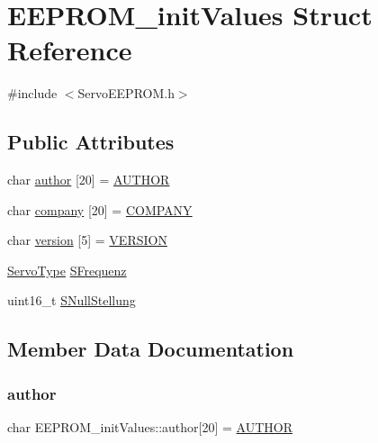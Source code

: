 \hypertarget{struct_e_e_p_r_o_m__init_values}{}\section{E\+E\+P\+R\+O\+M\+\_\+init\+Values Struct Reference}
\label{struct_e_e_p_r_o_m__init_values}


{\ttfamily \#include $<$Servo\+E\+E\+P\+R\+O\+M.\+h$>$}

\subsection*{Public Attributes}
\begin{DoxyCompactItemize}
\item 
char \hyperlink{struct_e_e_p_r_o_m__init_values_ade2f7625e2b736608b3ef57c135f95ba}{author} \mbox{[}20\mbox{]} = \hyperlink{_general_8h_a6c8fad838ed64cc67da3f68149009758}{A\+U\+T\+H\+OR}
\item 
char \hyperlink{struct_e_e_p_r_o_m__init_values_a6da00469d601a55300bf6b3c0ecf0cea}{company} \mbox{[}20\mbox{]} = \hyperlink{_general_8h_a66d6a95c2ba69f100898e9a415dfea64}{C\+O\+M\+P\+A\+NY}
\item 
char \hyperlink{struct_e_e_p_r_o_m__init_values_a1f5a8dd62c0be3b35b9d701a0f079be1}{version} \mbox{[}5\mbox{]} = \hyperlink{_general_8h_a1c6d5de492ac61ad29aec7aa9a436bbf}{V\+E\+R\+S\+I\+ON}
\item 
\hyperlink{_general_8h_ad0662fc04fff667bd896f8d92bebb0f3}{Servo\+Type} \hyperlink{struct_e_e_p_r_o_m__init_values_a4558d08ade80606c9f4e9f0447cbe4b8}{S\+Frequenz}
\item 
uint16\+\_\+t \hyperlink{struct_e_e_p_r_o_m__init_values_a457eae8a2370f49a7463e11bdab92400}{S\+Null\+Stellung}
\end{DoxyCompactItemize}


\subsection{Member Data Documentation}
\mbox{\label{struct_e_e_p_r_o_m__init_values_ade2f7625e2b736608b3ef57c135f95ba}} 
\subsubsection{\texorpdfstring{author}{author}}
{\footnotesize\ttfamily char E\+E\+P\+R\+O\+M\+\_\+init\+Values\+::author\mbox{[}20\mbox{]} = \hyperlink{_general_8h_a6c8fad838ed64cc67da3f68149009758}{A\+U\+T\+H\+OR}}

